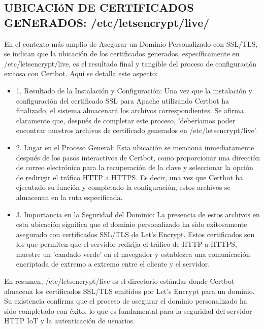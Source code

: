\documentclass{report}
\begin{document}
\subsection{UBICACIóN DE CERTIFICADOS GENERADOS: /etc/letsencrypt/live/}
En el contexto más amplio de Asegurar un Dominio Personalizado con SSL/TLS, se  indican que la ubicación de los 
certificados generados, específicamente en /etc/letsencrypt/live, es el resultado final y tangible del proceso de 
configuración exitosa con Certbot.
Aquí se detalla este aspecto:
\begin{itemize}
    \item 1. Resultado de la Instalación y Configuración: Una vez que la instalación y configuración del certificado SSL para Apache 
    utilizando Certbot ha finalizado, el sistema almacenará los archivos correspondientes. Se afirma claramente que, 
    después de completar este proceso, 'deberíamos poder encontrar nuestros archivos de certificado generados en /etc/letsencrypt/live'.
    \item 2. Lugar en el Proceso General: Esta ubicación se menciona inmediatamente después de los pasos interactivos de Certbot, 
    como proporcionar una dirección de correo electrónico para la recuperación de la clave y seleccionar la opción de redirigir el 
    tráfico HTTP a HTTPS. Es decir, una vez que Certbot ha ejecutado su función y completado la configuración, estos archivos se 
    almacenan en la ruta especificada.
    \item 3. Importancia en la Seguridad del Dominio: La presencia de estos archivos en esta ubicación significa que el dominio 
    personalizado ha sido exitosamente asegurado con certificados SSL/TLS de Let's Encrypt. Estos certificados son los que permiten 
    que el servidor redirija el tráfico de HTTP a HTTPS, muestre un 'candado verde' en el navegador y establezca una comunicación 
    encriptada de extremo a extremo entre el cliente y el servidor.
\end{itemize}
En resumen, /etc/letsencrypt/live es el directorio estándar donde Certbot almacena los certificados SSL/TLS emitidos por Let's Encrypt 
para un dominio. Su existencia confirma que el proceso de asegurar el dominio personalizado ha sido completado con éxito, lo que es 
fundamental para la seguridad del servidor HTTP IoT y la autenticación de usuarios.
\end{document}
